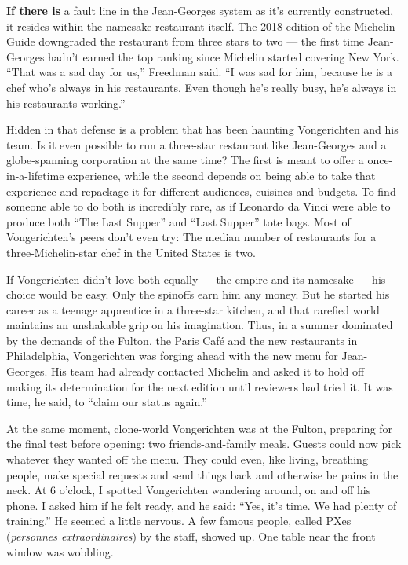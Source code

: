 \textbf{If there is} a fault line in the Jean-Georges system as it's
currently constructed, it resides within the namesake restaurant itself.
The 2018 edition of the Michelin Guide downgraded the restaurant from
three stars to two --- the first time Jean-Georges hadn't earned the top
ranking since Michelin started covering New York. ``That was a sad day
for us,'' Freedman said. ``I was sad for him, because he is a chef who's
always in his restaurants. Even though he's really busy, he's always in
his restaurants working.''

Hidden in that defense is a problem that has been haunting Vongerichten
and his team. Is it even possible to run a three-star restaurant like
Jean-Georges and a globe-spanning corporation at the same time? The
first is meant to offer a once-in-a-lifetime experience, while the
second depends on being able to take that experience and repackage it
for different audiences, cuisines and budgets. To find someone able to
do both is incredibly rare, as if Leonardo da Vinci were able to produce
both ``The Last Supper'' and ``Last Supper'' tote bags. Most of
Vongerichten's peers don't even try: The median number of restaurants
for a three-Michelin-star chef in the United States is two.

If Vongerichten didn't love both equally --- the empire and its namesake
--- his choice would be easy. Only the spinoffs earn him any money. But
he started his career as a teenage apprentice in a three-star kitchen,
and that rarefied world maintains an unshakable grip on his imagination.
Thus, in a summer dominated by the demands of the Fulton, the Paris Café
and the new restaurants in Philadelphia, Vongerichten was forging ahead
with the new menu for Jean-Georges. His team had already contacted
Michelin and asked it to hold off making its determination for the next
edition until reviewers had tried it. It was time, he said, to ``claim
our status again.''

At the same moment, clone-world Vongerichten was at the Fulton,
preparing for the final test before opening: two friends-and-family
meals. Guests could now pick whatever they wanted off the menu. They
could even, like living, breathing people, make special requests and
send things back and otherwise be pains in the neck. At 6 o'clock, I
spotted Vongerichten wandering around, on and off his phone. I asked him
if he felt ready, and he said: ``Yes, it's time. We had plenty of
training.'' He seemed a little nervous. A few famous people, called PXes
(\emph{personnes extraordinaires}) by the staff, showed up. One table
near the front window was wobbling.

